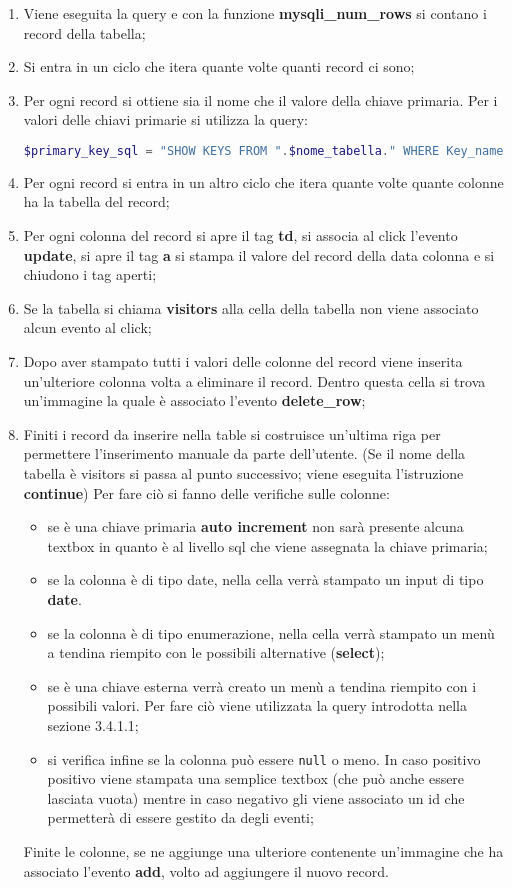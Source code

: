\begin{enumerate}
\item Viene eseguita la query e con la funzione \textbf{mysqli\_num\_rows} si contano i record della tabella;
\item Si entra in un ciclo che itera quante volte quanti record ci sono;
\item Per ogni record si ottiene sia il nome che il valore della chiave primaria. Per i valori delle chiavi primarie si utilizza la query:
\begin{lstlisting}[language=PHP]
$primary_key_sql = "SHOW KEYS FROM ".$nome_tabella." WHERE Key_name = 'PRIMARY'";
\end{lstlisting}
\item Per ogni record si entra in un altro ciclo che itera quante volte quante colonne ha la tabella del record;
\item Per ogni colonna del record si apre il tag \textbf{td}, si associa al click l'evento \textbf{update}, si apre il tag \textbf{a} si stampa il valore del record della data colonna e si chiudono i tag aperti;
\item Se la tabella si chiama \textbf{visitors} alla cella della tabella non viene associato alcun evento al click;
\item Dopo aver stampato tutti i valori delle colonne del record viene inserita un'ulteriore colonna volta a eliminare il record. Dentro questa cella si trova un'immagine la quale è associato l'evento \textbf{delete\_row};
\item Finiti i record da inserire nella table si costruisce un'ultima riga per permettere l'inserimento manuale da parte dell'utente. (Se il nome della tabella è visitors si passa al punto successivo; viene eseguita l'istruzione \textbf{continue}) Per fare ciò si fanno delle verifiche sulle colonne:
\begin{itemize}
\item se è una chiave primaria \textbf{auto increment} non sarà presente alcuna textbox in quanto è al livello sql che viene assegnata la chiave primaria;
\item se la colonna è di tipo date, nella cella verrà stampato un input di tipo \textbf{date}.
\item se la colonna è di tipo enumerazione, nella cella verrà stampato un menù a tendina riempito con le possibili alternative (\textbf{select});
\item se è una chiave esterna verrà creato un menù a tendina riempito con i possibili valori. Per fare ciò viene utilizzata la query introdotta nella sezione 3.4.1.1;
\item si verifica infine se la colonna può essere \texttt{null} o meno. In caso positivo positivo viene stampata una semplice textbox (che può anche essere lasciata vuota) mentre in caso negativo gli viene associato un id che permetterà di essere gestito da degli eventi;
\end{itemize} 
Finite le colonne, se ne aggiunge una ulteriore contenente un'immagine che ha associato l'evento \textbf{add}, volto ad aggiungere il nuovo record.
\end{enumerate}
